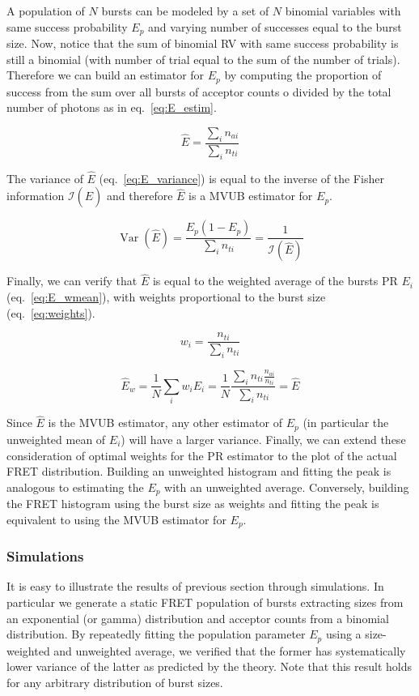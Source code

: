 A population of $N$ bursts can be modeled by a set of $N$ binomial
variables with same success probability $E_p$ and varying number of successes
equal to the burst size. Now, notice that the sum of binomial RV with same 
success probability is still a binomial (with number of trial equal to 
the sum of the number of trials).
Therefore we can build an estimator for $E_p$ by computing the proportion of
success from the sum over all bursts of acceptor counts o divided by the total
number of photons as in eq.~\ref{eq:E_estim}.

\begin{equation}
\label{eq:E_estim}
\hat{E} = \frac{\sum_i n_{ai}}{\sum_i n_{ti}}
\end{equation}

The variance of $\hat{E}$ (eq.~\ref{eq:E_variance}) is equal to the inverse of 
the Fisher information $\mathcal{I}(\hat{E})$ and therefore $\hat{E}$ is a MVUB 
estimator for $E_p$.

\begin{equation}
\label{eq:E_variance}
\operatorname{Var}(\hat{E}) = \frac{E_p (1 - E_p)}{\sum_i n_{ti}} = \frac{1}{\mathcal{I}(\hat{E})}
\end{equation}

Finally, we can verify that $\hat{E}$ is equal to the weighted average of the bursts
PR $E_i$ (eq.~\ref{eq:E_wmean}), with weights proportional to the burst size (eq.~\ref{eq:weights}).

\begin{equation}
\label{eq:weights}
w_i
= \frac{n_{ti}}{\sum_i n_{ti}}
\end{equation}

\begin{equation}
\label{eq:E_wmean}
\hat{E}_w = \frac{1}{N} \sum_i w_i E_i 
= \frac{1}{N} \frac{\sum_i n_{ti} \frac{n_{ai}}{n_{ti}} }{\sum_i n_{ti}} = \hat{E}
\end{equation}

Since $\hat{E}$ is the MVUB estimator, any other estimator of $E_p$ (in particular 
the unweighted mean of $E_i$) will have a larger variance.
Finally, we can extend these consideration of optimal weights for 
the PR estimator to the plot of the actual FRET distribution. Building an
unweighted histogram and fitting the peak is analogous to estimating the 
$E_p$ with an unweighted average. Conversely, building the FRET histogram
using the burst size as weights and fitting the peak is equivalent to using
the MVUB estimator for $E_p$.

\subsubsection{Simulations}
It is easy to illustrate the results of previous section through simulations.
In particular we generate a static FRET population of bursts extracting sizes 
from an exponential (or gamma) distribution and acceptor counts from a binomial
distribution. By repeatedly fitting the population parameter $E_p$ using a 
size-weighted and unweighted average, we verified that the former has systematically
lower variance of the latter as predicted by the theory. Note that this result
holds for any arbitrary distribution of burst sizes.

